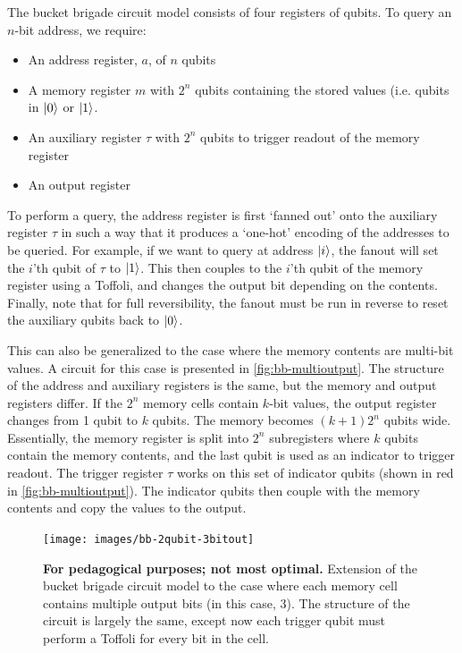 \documentclass[a4paper,12pt]{article}
\begin{document}
The bucket brigade circuit model consists of four registers of qubits. 
To query an $n$-bit address, we require:
\begin{itemize}
 \item An address register, $a$, of $n$ qubits
 \item A memory register $m$ with $2^n$ qubits containing the stored values (i.e. qubits in $\ket{0}$ or $\ket{1}$.
 \item An auxiliary register $\tau$ with $2^n$ qubits to trigger readout of the memory register
 \item An output register
\end{itemize}

To perform a query, the address register is first `fanned out' onto the auxiliary register $\tau$ in such a way that it produces a `one-hot' encoding of the addresses to be queried. 
For example, if we want to query at address $\ket{i}$, the fanout will set the $i$'th qubit of $\tau$ to $\ket{1}$. 
This then couples to the $i$'th qubit of the memory register using a Toffoli, and changes the output bit depending on the contents. 
Finally, note that for full reversibility, the fanout must be run in reverse to reset the auxiliary qubits back to $\ket{0}$. 

This can also be generalized to the case where the memory contents are multi-bit values. 
A circuit for this case is presented in \autoref{fig:bb-multioutput}. 
The structure of the address and auxiliary registers is the same, but the memory and output registers differ. 
If the $2^n$ memory cells contain $k$-bit values, the output register changes from 1 qubit to $k$ qubits.
The memory becomes $(k+1)2^n$ qubits wide. 
Essentially, the memory register is split into $2^n$ subregisters where $k$ qubits contain the memory contents, and the last qubit is used as an indicator to trigger readout. 
The trigger register $\tau$ works on this set of indicator qubits (shown in red in \autoref{fig:bb-multioutput}). 
The indicator qubits then couple with the memory contents and copy the values to the output.

\begin{figure}
 \centering
 \captionsetup{width=.89\linewidth}
 \texttt{[image: images/bb-2qubit-3bitout]}
 \caption{\textbf{For pedagogical purposes; not most optimal.} 
 Extension of the bucket brigade circuit model to the case where each memory cell contains multiple output bits (in this case, 3). 
 The structure of the circuit is largely the same, except now each trigger qubit must perform a Toffoli for every bit in the cell.}
 \label{fig:bb-multioutput}
\end{figure}
\end{document}
